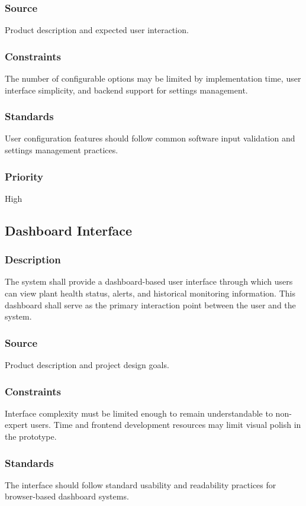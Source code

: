 \subsubsection{Source}
Product description and expected user interaction.

\subsubsection{Constraints}
The number of configurable options may be limited by implementation time, user interface simplicity, and backend support for settings management.

\subsubsection{Standards}
User configuration features should follow common software input validation and settings management practices.

\subsubsection{Priority}
High

\subsection{Dashboard Interface}
\subsubsection{Description}
The system shall provide a dashboard-based user interface through which users can view plant health status, alerts, and historical monitoring information. This dashboard shall serve as the primary interaction point between the user and the system.

\subsubsection{Source}
Product description and project design goals.

\subsubsection{Constraints}
Interface complexity must be limited enough to remain understandable to non-expert users. Time and frontend development resources may limit visual polish in the prototype.

\subsubsection{Standards}
The interface should follow standard usability and readability practices for browser-based dashboard systems.

